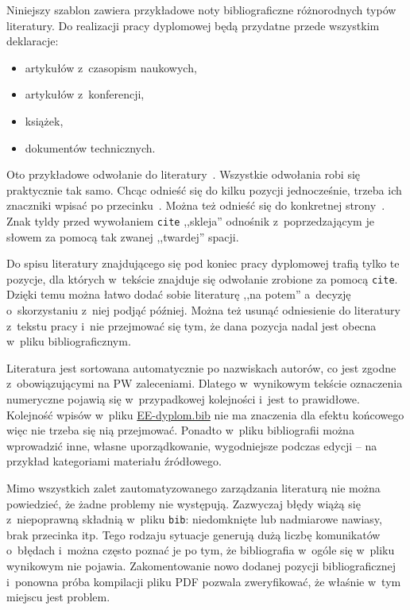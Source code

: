 Niniejszy szablon zawiera przykładowe noty bibliograficzne różnorodnych typów literatury. Do realizacji pracy dyplomowej będą przydatne przede wszystkim deklaracje:
\begin{itemize}
    \item artykułów z~czasopism naukowych,
    \item artykułów z~konferencji,
    \item książek,
    \item dokumentów technicznych.
\end{itemize}

Oto przykładowe odwołanie do literatury~\cite{fowler2009}. Wszystkie odwołania robi się praktycznie tak samo. Chcąc odnieść się do kilku pozycji jednocześnie, trzeba ich znaczniki wpisać po przecinku~\cite{maxwell1865,leksinski1995}. Można też odnieść się do konkretnej strony~\cite[s.~38]{leksinski1995}. Znak tyldy przed wywołaniem \texttt{cite} ,,skleja'' odnośnik z~poprzedzającym je słowem za pomocą tak zwanej ,,twardej'' spacji.

Do spisu literatury znajdującego się pod koniec pracy dyplomowej trafią tylko te pozycje, dla których w~tekście znajduje się odwołanie zrobione za pomocą \texttt{cite}. Dzięki temu można łatwo dodać sobie literaturę ,,na potem'' a~decyzję o~skorzystaniu z~niej podjąć później. Można też usunąć odniesienie do literatury z~tekstu pracy i~nie przejmować się tym, że dana pozycja nadal jest obecna w~pliku bibliograficznym. 

Literatura jest sortowana automatycznie po nazwiskach autorów, co jest zgodne z~obowiązującymi na PW zaleceniami. Dlatego w~wynikowym tekście oznaczenia numeryczne pojawią się w~przypadkowej kolejności i~jest to prawidłowe. Kolejność wpisów w~pliku \href{./EE-dyplom.bib}{EE-dyplom.bib} nie ma znaczenia dla efektu końcowego więc nie trzeba się nią przejmować. Ponadto w~pliku bibliografii można wprowadzić inne, własne uporządkowanie, wygodniejsze podczas edycji -- na przykład kategoriami materiału źródłowego.

Mimo wszystkich zalet zautomatyzowanego zarządzania literaturą nie można powiedzieć, że żadne problemy nie występują. Zazwyczaj błędy wiążą się z~niepoprawną składnią w~pliku \texttt{bib}: niedomknięte lub nadmiarowe nawiasy, brak przecinka itp. Tego rodzaju sytuacje generują dużą liczbę komunikatów o~błędach i~można często poznać je po tym, że bibliografia w~ogóle się w~pliku wynikowym nie pojawia. Zakomentowanie nowo dodanej pozycji bibliograficznej i~ponowna próba kompilacji pliku PDF pozwala zweryfikować, że właśnie w~tym miejscu jest problem.

